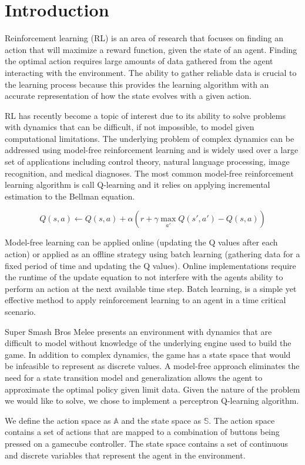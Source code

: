 
\section{Introduction}

Reinforcement learning (RL) is an area of research that focuses on finding an action that will maximize a reward function, given the state of an agent. Finding the optimal action requires large amounts of data gathered from the agent interacting with the environment. The ability to gather reliable data is crucial to the learning process because this provides the learning algorithm with an accurate representation of how the state evolves with a given action. 

RL has recently become a topic of interest due to its ability to solve problems with dynamics that can be difficult, if not impossible, to model given computational limitations. The underlying problem of complex dynamics can be addressed using model-free reinforcement learning and is widely used over a large set of applications including control theory, natural language processing, image recognition, and medical diagnoses. The most common model-free reinforcement learning algorithm is call Q-learning and it relies on applying incremental estimation to the Bellman equation.

\begin{equation}
	Q(s,a) \leftarrow Q(s,a)+\alpha(r + \gamma \max_{a'} Q(s',a') - Q(s,a))
\end{equation}


Model-free learning can be applied online (updating the Q values after each action) or applied as an offline strategy using batch learning (gathering data for a fixed period of time and updating the Q values). Online implementations require the runtime of the update equation to not interfere with the agents ability to perform an action at the next available time step. Batch learning, is a simple yet effective method to apply reinforcement learning to an agent in a time critical scenario. 

Super Smash Bros Melee presents an environment with dynamics that are difficult to model without knowledge of the underlying engine used to build the game. In addition to complex dynamics, the game has a state space that would be infeasible to represent as discrete values. A model-free approach eliminates the need for a state transition model and generalization allows the agent to approximate the optimal policy given limit data. Given the nature of the problem we would like to solve, we chose to implement a perceptron Q-learning algorithm.

We define the action space as $\mathbb{A}$ and the state space as $\mathbb{S}$. The action space contains a set of actions that are mapped to a combination of buttons being pressed on a gamecube controller. The state space contains a set of continuous and discrete variables that represent the agent in the environment.



